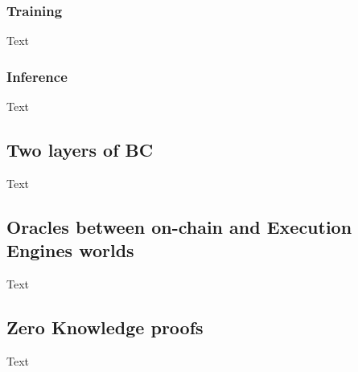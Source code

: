 \documentclass{article}
\begin{document}
\subsubsection{Training}
Text
\subsubsection{Inference}
Text

\subsection{Two layers of BC}
Text

\subsection{Oracles between on-chain and Execution Engines worlds}
Text

\subsection{Zero Knowledge proofs}
Text

  
  
\end{document}
